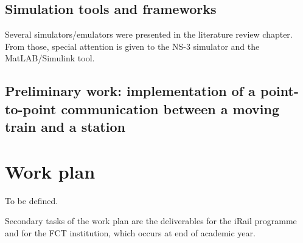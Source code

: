 \subsection{Simulation tools and frameworks}

Several simulators/emulators were presented in the literature review chapter. From those, special attention is given to the NS-3 simulator and the MatLAB/Simulink tool.  

\subsection{Preliminary work: implementation of a point-to-point communication between a moving train and a station}



\section{Work plan}
\label{sec:44}

To be defined.

Secondary tasks of the work plan are the deliverables for the iRail programme and for the FCT institution, which occurs at end of academic year. 


